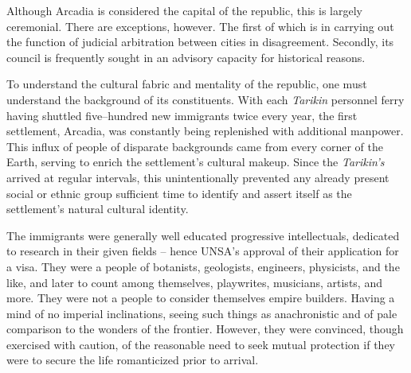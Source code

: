 Although Arcadia is considered the capital of the republic, this is largely ceremonial. There are exceptions, however. The first of which is in carrying out the function of judicial arbitration between cities in disagreement. Secondly, its council is frequently sought in an advisory capacity for historical reasons.

To understand the cultural fabric and mentality of the republic, one must understand the background of its constituents. With each {\it Tarikin} personnel ferry having shuttled five--hundred new immigrants twice every year, the first settlement, Arcadia, was constantly being replenished with additional manpower. This influx of people of disparate backgrounds came from every corner of the Earth, serving to enrich the settlement's cultural makeup. Since the {\it Tarikin's} arrived at regular intervals, this unintentionally prevented any already present social or ethnic group sufficient time to identify and assert itself as the settlement's natural cultural identity.

The immigrants were generally well educated progressive intellectuals, dedicated to research in their given fields -- hence UNSA's approval of their application for a visa. They were a people of botanists, geologists, engineers, physicists, and the like, and later to count among themselves, playwrites, musicians, artists, and more. They were not a people to consider themselves empire builders. Having a mind of no imperial inclinations, seeing such things as anachronistic and of pale comparison to the wonders of the frontier. However, they were convinced, though exercised with caution, of the reasonable need to seek mutual protection if they were to secure the life romanticized prior to arrival.


